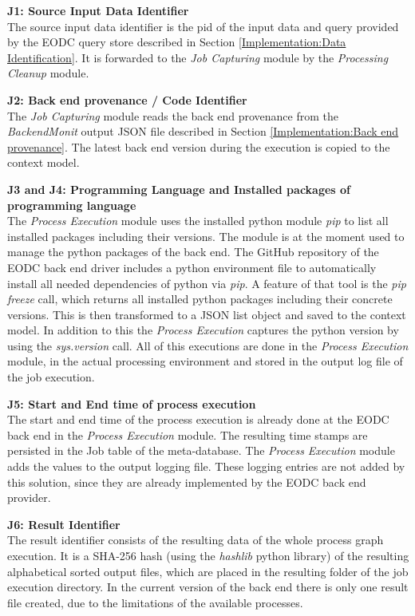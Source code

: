 \documentclass[draft,final]{vutinfth} %
\begin{document}
\textbf{J1:  Source Input Data Identifier} \\
The source input data identifier is the pid of the input data and query provided by the EODC query store described in Section \ref{Implementation:Data Identification}. It is forwarded to the \textit{Job Capturing} module by the \textit{Processing Cleanup} module. 

\textbf{J2: Back end provenance / Code Identifier} \\
The \textit{Job Capturing} module reads the back end provenance from the \textit{BackendMonit} output JSON file described in Section \ref{Implementation:Back end provenance}. The latest back end version during the execution is copied to the context model.

\textbf{J3 and J4: Programming Language and  Installed packages of programming language} \\
The \textit{Process Execution} module uses the installed python module \textit{pip} to list all installed packages including their versions. The module is at the moment used to manage the python packages of the back end. The GitHub repository of the EODC back end driver includes a python environment file to automatically install all needed dependencies of python via \textit{pip}. A feature of that tool is the \textit{pip freeze} call, which returns all installed python packages including their concrete versions. This is then transformed to a JSON list object and saved to the context model. In addition to this the \textit{Process Execution} captures the python version by using the \textit{sys.version} call. All of this executions are done in the \textit{Process Execution} module, in the actual processing environment and stored in the output log file of the job execution.    

\textbf{J5: Start and End time of process execution} \\
The start and end time of the process execution is already done at the EODC back end in the  \textit{Process Execution} module. The resulting time stamps are persisted in the Job table of the meta-database. The \textit{Process Execution} module adds the values to the output logging file. These logging entries are not added by this solution, since they are already implemented by the EODC back end provider.  

\textbf{J6: Result Identifier } \\
The result identifier consists of the resulting data of the whole process graph execution. It is a SHA-256 hash (using the \textit{hashlib} python library) of the resulting alphabetical sorted output files, which are placed in the resulting folder of the job execution directory. In the current version of the back end there is only one result file created, due to the limitations of the available processes.  
\end{document}
